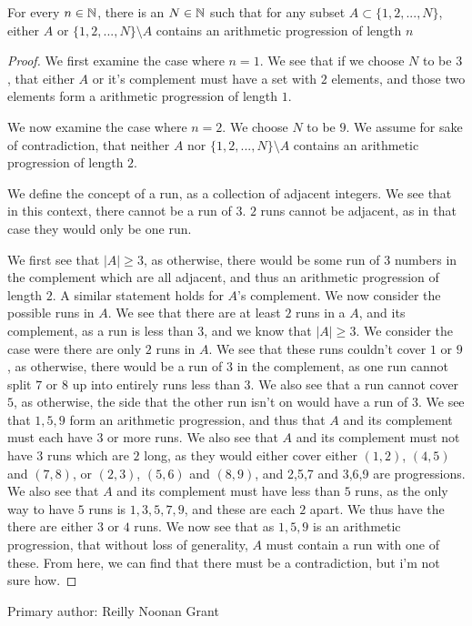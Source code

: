 \begin{majorEx}
  For every $n \in \mathbb{N}$, there is an $N \in \mathbb{N}$ such that for any
  subset $A \subset \{1,2,...,N\}$, either $A$ or $\{1,2,...,N\}
  \setminus A$ contains an arithmetic progression of length $n$
\end{majorEx}

\begin{proof}
  We first examine the case where $n=1$. We see that if we choose $N$
  to be $3$, that either $A$ or it's complement must have a set with
  $2$ elements, and those two elements form a arithmetic progression
  of length $1$.

  We now examine the case where $n=2$. We choose $N$ to
  be $9$. We assume for sake of contradiction, that neither $A$ nor 
  $\{1,2,...,N\} \setminus A$ contains an arithmetic progression 
  of length $2$. 

  We define the concept of a run, as a collection of adjacent
  integers. We see that in this context, there cannot be a run of
  $3$. $2$ runs cannot be adjacent, as in that case they would only be
  one run.

  We first see that $|A|\geq 3$, as otherwise, there
  would be some run of $3$ numbers in the complement which 
  are all adjacent, and thus an
  arithmetic progression of length $2$. A similar statement holds for
  $A$'s complement. We now consider the possible
  runs in $A$. We see that there are at least $2$ runs in a $A$, and
  its complement, as a run is less than $3$, and we know that $|A|\geq
  3$. We consider the case were there are only $2$ runs in $A$. 
  We see that these runs couldn't cover $1$ or $9$, as otherwise,
  there would be a run of $3$ in the complement, as one run cannot
  split $7$ or $8$ up into entirely runs less than $3$. We also see
  that a run cannot cover $5$, as otherwise, the side that the other
  run isn't on would have a run of $3$. We see that $1,5,9$ form an
  arithmetic progression, and thus that $A$ and its complement must
  each have $3$ or more runs. We also see that $A$ and its complement
  must not have $3$ runs which are $2$ long, as they would either
  cover either $(1,2)$, $(4,5)$ and $(7,8)$, or $(2,3)$, $(5,6)$ and
  $(8,9)$, and 2,5,7 and 3,6,9 are progressions. We also see that $A$
  and its complement must have less than $5$ runs, as the only way to
  have $5$ runs is $1,3,5,7,9$, and these are each $2$ apart. We thus
  have the there are either $3$ or $4$ runs. We now see that as
  $1,5,9$ is an arithmetic progression, that without loss of
  generality, $A$ must contain a run with one of these. From here, we
  can find that there must be a contradiction, but i'm not sure how.
\end{proof}

Primary author: Reilly Noonan Grant
